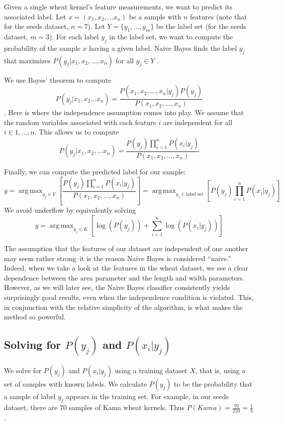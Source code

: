 \documentclass[12pt]{article}
\newcommand{\brac}[1]{\left[ #1 \right]}
\DeclareMathOperator*{\argmax}{\arg\,max}
\begin{document}
Given a single wheat kernel's feature measurements, we want to predict its associated label.
Let $x = (x_1, x_2, \ldots x_n)$ be a sample with $n$ features (note that for the seeds dataset, $n = 7$). 
Let $Y = \{y_1, \ldots, y_m\}$ be the label set (for the seeds dataset, $m=3$).
For each label $y_j$ in the label set, we want to compute the probability of the sample $x$ having a given label.
Naive Bayes finds the label $y_j$ that maximizes $P(y_j | x_1, x_2, \ldots, x_n)$ for all $y_j \in Y$ \cite{NaiveBayes}.

 We use Bayes' theorem to compute $$P(y_j|x_1, x_2 \ldots x_n) = \frac{P(x_1, x_2, \ldots, x_n|y_j) P(y_j)}{P(x_1, x_2, \ldots, x_n)}$$.
 Here is where the independence assumption comes into play. 
 We assume that the random variables associated with each feature $i$ are independent for all $i \in {1, \ldots, n}$.
This allows us to compute $$P(y_j|x_1, x_2, \ldots x_n) = \frac{P(y_j) \prod_{i=1}^n P(x_i|y_j)}{P(x_1, x_2, \ldots, x_n)}$$

Finally, we can compute the predicted label for our sample:
$$y = \argmax_{y_j \in Y} \brac{\frac{P(y_j) \prod_{i=1}^n P(x_i|y_j)}{P(x_1, x_2, \ldots, x_n)}} = \argmax_{y_j \in \text{label set}}\brac{P(y_j) \prod_{i=1}^n P(x_i|y_j)}$$
We avoid underflow by equivalently solving
$$y = \argmax_{y_j \in K}\brac{\log(P(y_j)) + \sum_{i=1}^n \log(P(x_i|y_j))}$$

The assumption that the features of our dataset are independent of one another may seem rather strong--it is the reason Naive Bayes is considered ``naive.''
 Indeed, when we take a look at the features in the wheat dataset, we see a clear dependence between the area parameter and the length and width parameters. 
 However, as we will later see, the Naive Bayes classifier consistently yields surprisingly good results, even when the independence condition is violated.
 This, in conjunction with the relative simplicity of the algorithm, is what makes the method so powerful. 
 
\subsection*{Solving for $P(y_j)$ and $P(x_i|y_j)$}
We solve for $P(y_j)$ and $P(x_i|y_j)$ using a training dataset $X$, that is, using a set of samples with known labels.
We calculate $P(y_j)$ to be the probability that a sample of label $y_j$ appears in the training set. 
For example, in our seeds dataset, there are $70$ samples of Kama wheat kernels. 
Thus $P(Kama) = \frac{70}{210} = \frac{1}{3}$.
\end{document}
